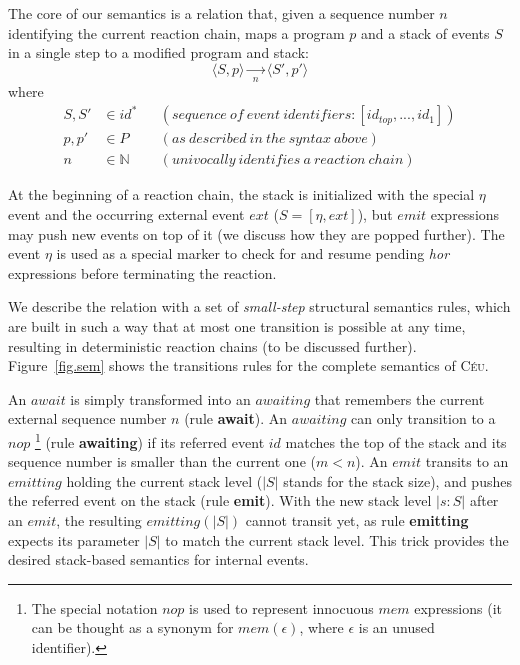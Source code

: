 \documentclass{acm_proc_article-sp}
\newcommand{\CEU}{\textsc{C\'{e}u}\xspace}
\newcommand{\code}[1] {{\small{\texttt{#1}}}}
\newcommand{\LL}{\langle}
\newcommand{\RR}{\rangle}
\newcommand{\rr}[1] {{\textbf{\scriptsize{#1}}}}
\newcommand{\1}{\;}
\newcommand{\2}{\;\;}
\newcommand{\3}{\;\;\;}
\newcommand{\5}{\;\;\;\;\;}
\begin{document}
The core of our semantics is a relation that, given a sequence number $n$ 
identifying the current reaction chain, maps a program $p$ and a stack of 
events $S$ in a single step to a modified program and stack:
%
$$
\LL S, p \RR
    \xrightarrow[~~n~~]{}
\LL S', p' \RR
$$
%
where
%
\begin{align*}
S, S' &\in id^*
    &&(sequence~of~event~identifiers: [id_{top}, ..., id_1]) \\
p, p' &\in P
    && (as~described~in~the~syntax~above) \\
n     &\in \mathds{N}
    && (univocally~identifies~a~reaction~chain)
\end{align*}

At the beginning of a reaction chain, the stack is initialized with the special 
$\eta$ event and the occurring external event $ext$ ($S=[\eta,ext]$), but 
$emit$ expressions may push new events on top of it (we discuss how they are 
popped further).
%
The event $\eta$ is used as a special marker to check for and resume pending 
\emph{hor} expressions before terminating the reaction.

We describe the relation with a set of \emph{small-step} structural semantics 
rules, which are built in such a way that at most one transition is possible at 
any time, resulting in deterministic reaction chains (to be discussed further).
%
Figure~\ref{fig.sem} shows the transitions rules for the complete semantics of 
\CEU.

An $await$ is simply transformed into an $awaiting$ that remembers the current 
external sequence number $n$ (rule \rr{await}).
An $awaiting$ can only transition to a $nop$%
\footnote{
The special notation $nop$ is used to represent innocuous $mem$ expressions (it 
can be thought as a synonym for $mem(\epsilon)$, where $\epsilon$ is an unused 
identifier).
}
(rule \rr{awaiting}) if its referred event $id$ matches the top of the stack 
and its sequence number is smaller than the current one ($m<n$).
%
%
An $emit$ transits to an $emitting$ holding the current stack level ($|S|$ 
stands for the stack size), and pushes the referred event on the stack (rule 
\rr{emit}).
With the new stack level $|s:S|$ after an $emit$, the resulting $emitting(|S|)$ 
cannot transit yet, as rule \rr{emitting} expects its parameter $|S|$ to match 
the current stack level.
This trick provides the desired stack-based semantics for internal events.
\end{document}
